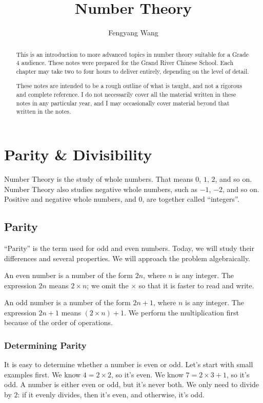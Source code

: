 \documentclass[a4paper,10pt]{report}
\title{Number Theory}
\author{Fengyang Wang}
\begin{document}
\begin{abstract}
 This is an introduction to more advanced topics in number theory suitable for
 a Grade 4 audience. These notes were prepared for the Grand River Chinese
 School. Each chapter may take two to four hours to deliver entirely, depending
 on the level of detail.

 These notes are intended to be a rough outline of what is taught, and not a
 rigorous and complete reference. I do not necessarily cover all the material
 written in these notes in any particular year, and I may occasionally cover
 material beyond that written in the notes.
\end{abstract}

\maketitle

\tableofcontents

\chapter{Parity \& Divisibility}

Number Theory is the study of whole numbers. That means $0$, $1$, $2$, and so
on. Number Theory also studies negative whole numbers, such as $-1$, $-2$, and
so on. Positive and negative whole numbers, and $0$, are together called
``integers''.

\section{Parity}

``Parity'' is the term used for odd and even numbers. Today, we will study their
differences and several properties. We will approach the problem algebraically.

An even number is a number of the form $2n$, where $n$ is any integer. The
expression $2n$ means $2\times n$; we omit the $\times$ so that it is faster to
read and write.

An odd number is a number of the form $2n+1$, where $n$ is any integer. The
expression $2n+1$ means $(2\times n) + 1$. We perform the multiplication first
because of the order of operations.

\subsection{Determining Parity}
It is easy to determine whether a number is even or odd. Let's start with small
examples first. We know $4=2\times2$, so it's even. We know $7=2\times3+1$, so
it's odd. A number is either even or odd, but it's never both. We only need to
divide by $2$: if it evenly divides, then it's even, and otherwise, it's odd.
\end{document}
